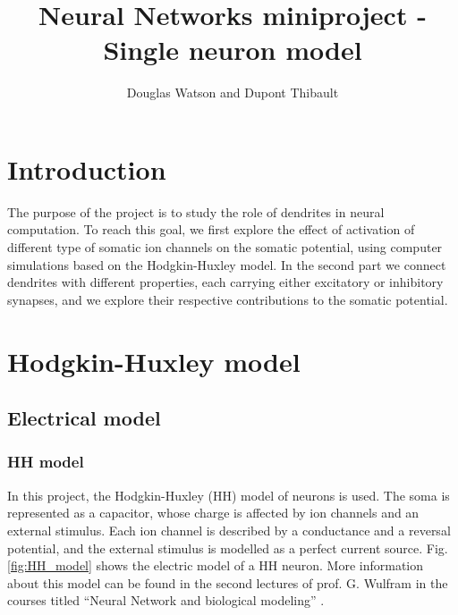\documentclass[a4paper, 10pt, conference]{ieeeconf}      %
\title{\LARGE \bf
Neural Networks miniproject - Single neuron model
}
\author{Douglas Watson and Dupont Thibault}
\begin{document}
\newcommand{\order}[1]{$\cdot 10^{#1}$}
\newcommand{\pvalue}[2]{p-value $< #1 \cdot 10^{#2}$}
\renewcommand{\thefigure}{\arabic{figure}}

\maketitle
\thispagestyle{fancyplain}




\setcounter{tocdepth}{10}
\tableofcontents

\section{Introduction}
The purpose of the project is to study the role of dendrites in neural computation. To reach this goal, we first explore the effect of activation of different type of somatic ion channels on the somatic potential, using computer simulations based on the Hodgkin-Huxley model. In the second part we connect dendrites with different properties, each carrying either excitatory or inhibitory synapses, and we explore their respective contributions to the somatic potential. \\

\section{Hodgkin-Huxley model}




\subsection{Electrical model}



\subsubsection*{HH model}

In this project, the Hodgkin-Huxley (HH) model of neurons is used. The soma is represented as a capacitor, whose charge is affected by ion channels and an external stimulus. Each ion channel is described by a conductance and a reversal potential, and the external stimulus is modelled as a perfect current source. Fig. \ref{fig:HH_model} shows the electric model of a HH neuron. More information about this model can be found in the second lectures of prof. G. Wulfram in the courses titled “Neural Network and biological modeling” \cite{course}. \\
\end{document}
